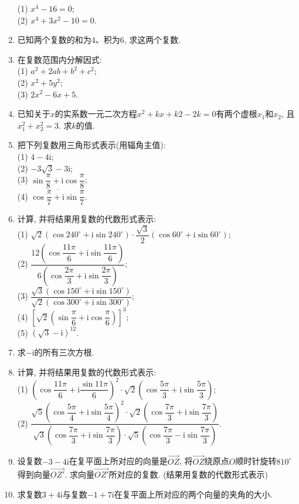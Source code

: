 \documentclass[10pt,a4paper]{article}
\begin{document}
\begin{enumerate}[1.]
(1) $x^4-16=0$;\\
(2) $x^4+3x^2-10=0$.
\item 已知两个复数的和为$4$、积为$6$, 求这两个复数.
\item 在复数范围内分解因式:\\
(1) $a^2+2ab+b^2+c^2$;\\
(2) $x^2+5y^2$;\\
(3) $2x^2-6x+5$.
\item 已知关于$x$的实系数一元二次方程$x^2+kx+k2-2k=0$有两个虚根$x_1$和$x_2$, 且$x_1^2+x_2^2=3$. 求$k$的值.
\item 把下列复数用三角形式表示(用辐角主值):\\
(1) $4-4\mathrm{i}$;\\
(2) $-3\sqrt 3-3\mathrm{i}$;\\
(3) $\sin \dfrac \pi 8+\mathrm{i}\cos \dfrac \pi 8$;\\
(4) $\overline{\cos \dfrac \pi 7+\mathrm{i}\sin\dfrac \pi 7}$.
\item 计算, 并将结果用复数的代数形式表示:\\
(1) $\sqrt 2(\cos 240^\circ +\mathrm{i}\sin 240^\circ)\cdot \dfrac{\sqrt 3}2(\cos 60^\circ +\mathrm{i}\sin 60^\circ)$;\\
(2) $\dfrac{12(\cos \dfrac{11\pi} 6+\mathrm{i}\sin \dfrac{11\pi} 6)}{6(\cos \dfrac{2\pi} 3+\mathrm{i}\sin \dfrac{2\pi}3)}$;\\
(3) $\dfrac{\sqrt 3(\cos 150^\circ +\mathrm{i}\sin 150^\circ)}{\sqrt 2(\cos 300^\circ +\mathrm{i}\sin 300^\circ)}$;\\
(4) $[\sqrt 2(\sin \dfrac\pi 6+\mathrm{i}\cos \dfrac \pi 6)]^3$;\\
(5) $(\sqrt 3-\mathrm{i})^{12}$.
\item 求$-\mathrm{i}$的所有三次方根.
\item 计算, 并将结果用复数的代数形式表示:\\
(1) $(\cos \dfrac{11\pi}6 +\mathrm{i}\dfrac{\sin 11\pi}6)^2\cdot \sqrt 2(\cos \dfrac{5\pi} 3+\mathrm{i}\sin \dfrac{5\pi}3)$;\\
(2) $\dfrac{\sqrt 5(\cos \dfrac{5\pi} 4+\mathrm{i}\sin \dfrac{5\pi} 4)^2\cdot \sqrt 2(\cos \dfrac{7\pi} 3+\mathrm{i}\sin \dfrac{7\pi} 3)}{
\sqrt 3(\cos \dfrac{7\pi} 3+\mathrm{i}\sin \dfrac{7\pi} 3)\cdot \sqrt 5(\cos \dfrac{7\pi} 3-\mathrm{i}\sin \dfrac{7\pi} 3)}$.
\item 设复数$-3-4\mathrm{i}$在复平面上所对应的向量是$\overrightarrow{OZ}$, 将$\overrightarrow{OZ}$绕原点$O$顺时针旋转$810^\circ$得到向量$\overrightarrow{OZ'}$. 求向量$\overrightarrow{OZ'}$所对应的复数. (结果用复数的代数形式表示)
\item 求复数$3+4\mathrm{i}$与复数$-1+7\mathrm{i}$在复平面上所对应的两个向量的夹角的大小.  




\end{enumerate}
\end{document}
